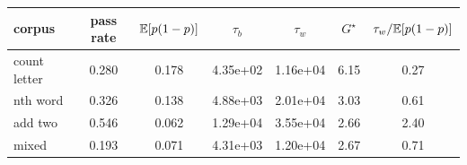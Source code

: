 \begin{tabular}{lcccccc}
\toprule
corpus & pass rate & $\mathbb{E}[p(1-p)]$ & $\tau_b$ & $\tau_w$ & $G^{\star}$ & $\tau_w/\mathbb{E}[p(1-p)]$ \\
\midrule
count letter & 0.280 & 0.178 & 4.35e+02 & 1.16e+04 & 6.15 & 0.27 \\
nth word & 0.326 & 0.138 & 4.88e+03 & 2.01e+04 & 3.03 & 0.61 \\
add two & 0.546 & 0.062 & 1.29e+04 & 3.55e+04 & 2.66 & 2.40 \\
mixed & 0.193 & 0.071 & 4.31e+03 & 1.20e+04 & 2.67 & 0.71 \\
\bottomrule
\end{tabular}